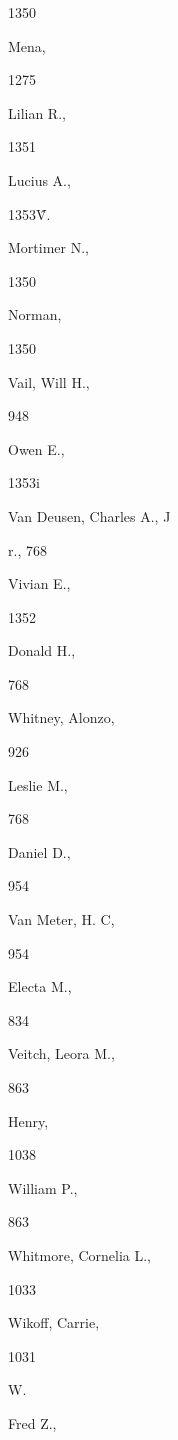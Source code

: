 \documentclass{book}
\begin{document}
{{{{{1350 


Mena, 


1275 


Lilian R., 


1351 






Lucius A., 


1353\^ 


V. 




Mortimer N., 


1350 






Norman, 


1350 


Vail, Will H., 


948 


Owen E., 


1353i 


Van Deusen, Charles A., J 


r., 768 


Vivian E., 


1352 


Donald H., 


768 


Whitney, Alonzo, 


926 


Leslie M., 


768 


Daniel D., 


954 


Van Meter, H. C, 


954 


Electa M., 


834 


Veitch, Leora M., 


863 


Henry, 


1038 


William P., 


863 


Whitmore, Cornelia L., 


1033 






Wikoff, Carrie, 


1031 


W. 




Fred Z., 


}}}}}
\end{document}
